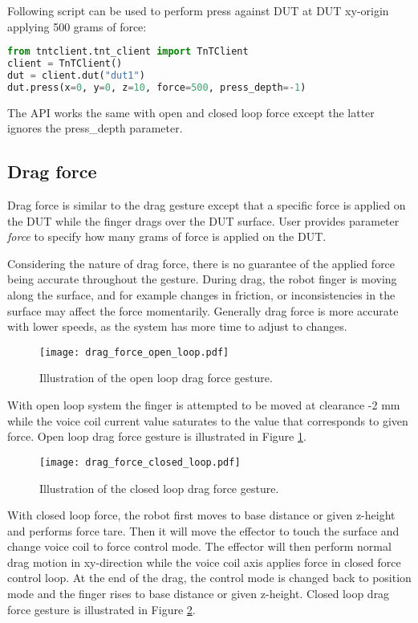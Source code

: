 Following script can be used to perform press against DUT at DUT xy-origin applying 500 grams of force:

\begin{lstlisting}[language=Python]
from tntclient.tnt_client import TnTClient
client = TnTClient()
dut = client.dut("dut1")
dut.press(x=0, y=0, z=10, force=500, press_depth=-1)
\end{lstlisting}

The API works the same with open and closed loop force except the latter ignores the press\_depth parameter.

\subsection{Drag force}

Drag force is similar to the drag gesture except that a specific force is applied on the DUT while the finger drags over the DUT surface. User provides parameter \emph{force} to specify how many grams of force is applied on the DUT. 

Considering the nature of drag force, there is no guarantee of the applied force being accurate throughout the gesture. During drag, the robot finger is moving along the surface, and for example changes in friction, or inconsistencies in the surface may affect the force momentarily. Generally drag force is more accurate with lower speeds, as the system has more time to adjust to changes.

\begin{figure}[h]
	\centering
	\texttt{[image: drag\_force\_open\_loop.pdf]}
	\caption{Illustration of the open loop drag force gesture.}
	\label{fig:open_loop_drag_force}
\end{figure}

With open loop system the finger is attempted to be moved at clearance -2 mm while the voice coil current value saturates to the value that corresponds to given force. Open loop drag force gesture is illustrated in Figure \ref{fig:open_loop_drag_force}.

\begin{figure}[h]
	\centering
	\texttt{[image: drag\_force\_closed\_loop.pdf]}
	\caption{Illustration of the closed loop drag force gesture.}
	\label{fig:closed_loop_drag_force}
\end{figure}

With closed loop force, the robot first moves to base distance or given z-height and performs force tare. Then it will move the effector to touch the surface and change voice coil to force control mode. The effector will then perform normal drag motion in xy-direction while the voice coil axis applies force in closed force control loop. At the end of the drag, the control mode is changed back to position mode and the finger rises to base distance or given z-height. Closed loop drag force gesture is illustrated in Figure \ref{fig:closed_loop_drag_force}.

